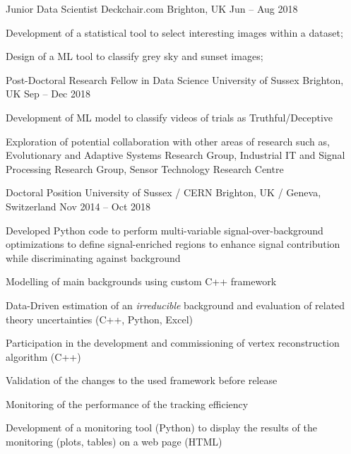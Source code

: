 \begin{cventries}
    \cventry
    {Junior Data Scientist}
    {Deckchair.com}
    {Brighton, UK}
    {Jun -- Aug 2018}
    {
      \begin{cvitems}
        \item Development of a statistical tool to select interesting images within a dataset;
        \item Design of a ML tool to classify grey sky and sunset images;
      \end{cvitems}
    }
  \end{cventries}

  \begin{cventries}
    \cventry
    {Post-Doctoral Research Fellow in Data Science}
    {University of Sussex}
    {Brighton, UK}
    {Sep -- Dec 2018}
    {
      \begin{cvitems}
        \item Development of ML model to classify videos of trials as Truthful/Deceptive
        \item Exploration of potential collaboration with other areas of research such as, Evolutionary and Adaptive Systems Research Group, Industrial IT and Signal Processing Research Group, Sensor Technology Research Centre
      \end{cvitems}
    }
  \end{cventries}

  \begin{cventries}    
    \cventry
    {Doctoral Position}
    {University of Sussex / CERN}
    {Brighton, UK / Geneva, Switzerland}
    {Nov 2014 -- Oct 2018}
    {
    \begin{cvitems}
      \item Developed Python code to perform multi-variable signal-over-background optimizations to define signal-enriched regions to enhance signal contribution while discriminating against background
      \item Modelling of main backgrounds using custom C++ framework
      \item Data-Driven estimation of an \emph{irreducible} background and evaluation of related theory uncertainties (C++, Python, Excel)
      \item Participation in the development and commissioning of vertex reconstruction algorithm (C++)
      \item Validation of the changes to the used framework before release
      \item Monitoring of the performance of the tracking efficiency
      \item Development of a monitoring tool (Python) to display the results of the monitoring (plots, tables) on a web page (HTML)
    \end{cvitems}
    }
  \end{cventries}

